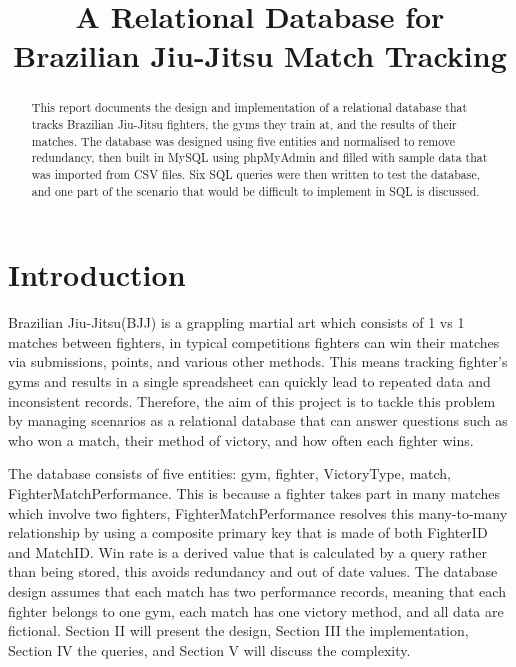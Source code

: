 \documentclass[conference,9pt]{IEEEtran}
\begin{document}
\title{A Relational Database for Brazilian Jiu-Jitsu Match Tracking}

\author{}

\maketitle

\begin{abstract}
This report documents the design and implementation of a relational database that tracks Brazilian Jiu-Jitsu fighters, the gyms they train at, and the results of their matches. The database was designed using five entities and normalised to remove redundancy, then built in MySQL using phpMyAdmin and filled with sample data that was imported from CSV files. Six SQL queries were then written to test the database, and one part of the scenario that would be difficult to implement in SQL is discussed.
\end{abstract}

\section{Introduction}

Brazilian Jiu-Jitsu(BJJ) is a grappling martial art which consists of 1 vs 1 matches between fighters, in typical competitions fighters can win their matches via submissions, points, and various other methods. This means tracking fighter's gyms and results in a single spreadsheet can quickly lead to repeated data and inconsistent records. Therefore, the aim of this project is to tackle this problem by managing scenarios as a relational database that can answer questions such as who won a match, their method of victory, and how often each fighter wins.

The database consists of five entities: gym, fighter, VictoryType, match, FighterMatchPerformance. This is because a fighter takes part in many matches which involve two fighters, FighterMatchPerformance resolves this many-to-many relationship by using a composite primary key that is made of both FighterID and MatchID. Win rate is a derived value that is calculated by a query rather than being stored, this avoids redundancy and out of date values. The database design assumes that each match has two performance records, meaning that each fighter belongs to one gym, each match has one victory method, and all data are fictional. Section II will present the design, Section III the implementation, Section IV the queries, and Section V will discuss the complexity.
\end{document}
